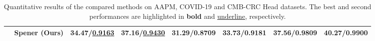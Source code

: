 \begin{table*}[!h]
\begin{tabular}{clcccccc}
                              & Spener (Ours)                       & \textbf{34.47}/\underline{0.9163} & \textbf{37.16}/\underline{0.9430} & \textbf{31.29}/\textbf{0.8709} & \textbf{33.73}/\textbf{0.9181} & \textbf{37.56}/\textbf{0.9809}               & \textbf{40.27}/\textbf{0.9900}                \\
\bottomrule
\end{tabular}
\caption{Quantitative results of the compared methods on AAPM, COVID-19 and CMB-CRC Head datasets. The best and second performances are highlighted in \textbf{bold} and \underline{underline}, respectively.}
\label{table1}
\end{table*}